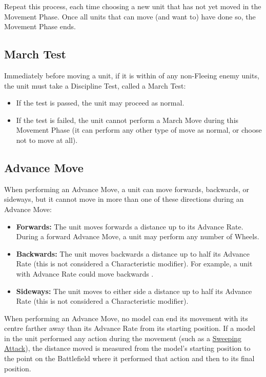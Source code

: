Repeat this process, each time choosing a new unit that has not yet moved in the Movement Phase. Once all units that can move (and want to) have done so, the Movement Phase ends.

\columnbreak

\subsection{March Test}
\label{march_test}

Immediately before moving a unit, if it is within  of any non-Fleeing enemy units, the unit must take a Discipline Test, called a March Test:
\begin{itemize}
\item If the test is passed, the unit may proceed as normal.
\item If the test is failed, the unit cannot perform a March Move during this Movement Phase (it can perform any other type of move as normal, or choose not to move at all).
\end{itemize}

\subsection{Advance Move}
\label{advance_move}

When performing an Advance Move, a unit can move forwards, backwards, or sideways, but it cannot move in more than one of these directions during an Advance Move:

\begin{itemize}
\item\textbf{Forwards:} The unit moves forwards a distance up to its Advance Rate. During a forward Advance Move, a unit may perform any number of Wheels.
\item\textbf{Backwards:} The unit moves backwards a distance up to half its Advance Rate (this is not considered a Characteristic modifier). For example, a unit with Advance Rate  could move backwards .
\item\textbf{Sideways:} The unit moves to either side a distance up to half its Advance Rate (this is not considered a Characteristic modifier).
\end{itemize}

When performing an Advance Move, no model can end its movement with its centre farther away than its Advance Rate from its starting position. If a model in the unit performed any action during the movement (such as a \hyperref[sweeping_attack]{Sweeping Attack}), the distance moved is measured from the model's starting position to the point on the Battlefield where it performed that action and then to its final position.

